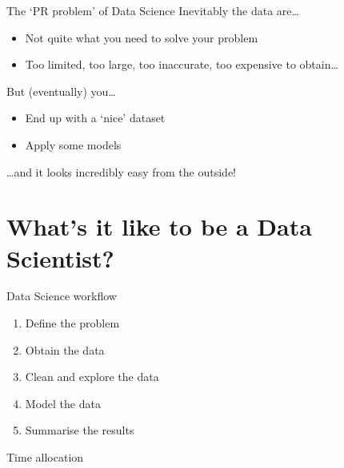 \begin{frame}{The `PR problem' of Data Science}
    Inevitably the data are\ldots\vspace{-1ex}
    \begin{itemize}
        \item Not quite what you need to solve your problem
        \item Too limited, too large, too inaccurate, too expensive to
              obtain\ldots
    \end{itemize}
    \vfill
    But (eventually) you\ldots\vspace{-1ex}
    \begin{itemize}
        \item End up with a `nice' dataset
        \item Apply some models
    \end{itemize}
    \vspace{-1ex}
    \ldots and it \alert{looks} incredibly easy from the outside!
\end{frame}

\section[What's it like \\ to be a Data Scientist?]%
        {What's it like to be a Data Scientist?}

\begin{frame}{Data Science workflow}
    \begin{enumerate}
        \setlength{\itemsep}{0.75em}
        \item Define the problem
        \item Obtain the data
        \item Clean and explore the data
        \item Model the data
        \item Summarise the results
    \end{enumerate}
\end{frame}

\begin{frame}{Time allocation}
\end{frame}


